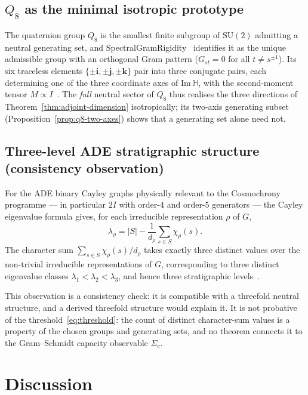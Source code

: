 \documentclass[11pt,a4paper]{article}
\newcommand{\ImH}{\mathrm{Im}\,\mathbb{H}}
\newcommand{\SU}{\mathrm{SU}}
\begin{document}
  \subsection{$Q_{8}$ as the minimal isotropic prototype}
    \label{ssec:q8}

    The quaternion group $Q_{8}$ is the smallest finite subgroup of $\SU(2)$ admitting a
    neutral generating set, and SpectralGramRigidity~\cite{Beau2026a3} identifies
    it as the unique admissible group with an orthogonal Gram pattern
    ($G_{st} = 0$ for all $t \neq s^{\pm 1}$).
    Its six traceless elements $\{\pm\mathbf{i}, \pm\mathbf{j}, \pm\mathbf{k}\}$
    pair into three conjugate pairs, each determining one of the three coordinate axes
    of $\ImH$, with the second-moment tensor $M \propto I$~\cite{Beau2026a3}.
    The \emph{full} neutral sector of $Q_{8}$ thus realises the three directions of
    Theorem~\ref{thm:adjoint-dimension} isotropically; its two-axis generating subset
    (Proposition~\ref{prop:q8-two-axes}) shows that a generating set alone need not.

  \subsection{Three-level ADE stratigraphic structure (consistency observation)}
    \label{ssec:ade-three-levels}

    For the ADE binary Cayley graphs physically relevant to the Cosmochrony
    programme --- in particular $2I$ with order-$4$ and order-$5$ generators --- the
    Cayley eigenvalue formula gives, for each irreducible representation $\rho$ of $G$,
    \[
      \lambda_{\rho} = |S| - \frac{1}{d_{\rho}} \sum_{s \in S} \chi_{\rho}(s).
    \]
    The character sum $\sum_{s \in S} \chi_{\rho}(s) / d_{\rho}$ takes exactly three
    distinct values over the non-trivial irreducible representations of $G$, corresponding
    to three distinct eigenvalue classes $\lambda_{1} < \lambda_{2} < \lambda_{3}$, and
    hence three stratigraphic levels~\cite{Beau2026a4}.

    This observation is a consistency check: it is compatible with a threefold neutral
    structure, and a derived threefold structure would explain it.
    It is not probative of the threshold~\eqref{eq:threshold}: the count of distinct
    character-sum values is a property of the chosen groups and generating sets, and no
    theorem connects it to the Gram--Schmidt capacity observable $\Sigma_{c}$.

  \section{Discussion}
  \label{sec:discussion}
\end{document}
